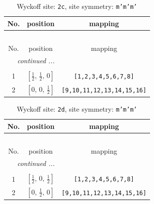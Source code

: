 \documentclass[fleqn,8pt]{jsarticle}
\begin{document}
\renewcommand{\arraystretch}{1.2}
\begin{longtable}{ccc}
\caption{Wyckoff site: {\tt 2c}, site symmetry: {\tt m'm'm'}}
 \\
 \hline \hline
No. & position & mapping \\ \hline \endfirsthead

\multicolumn{2}{l}{\tablename\ \thetable{}} \\
 \hline \hline
No. & position & mapping \\ \hline \endhead

 \hline \hline
\multicolumn{2}{r}{\footnotesize\it continued ...} \\ \endfoot

 \hline \hline
\multicolumn{2}{r}{} \\ \endlastfoot

1 & $\left[ \frac{1}{2},\, \frac{1}{2},\, 0 \right]$ & {\tt [1,2,3,4,5,6,7,8]} \\ \hline
2 & $\left[ 0,\, 0,\, \frac{1}{2} \right]$ & {\tt [9,10,11,12,13,14,15,16]} \\
\end{longtable}
\renewcommand{\arraystretch}{1.2}
\begin{longtable}{ccc}
\caption{Wyckoff site: {\tt 2d}, site symmetry: {\tt m'm'm'}}
 \\
 \hline \hline
No. & position & mapping \\ \hline \endfirsthead

\multicolumn{2}{l}{\tablename\ \thetable{}} \\
 \hline \hline
No. & position & mapping \\ \hline \endhead

 \hline \hline
\multicolumn{2}{r}{\footnotesize\it continued ...} \\ \endfoot

 \hline \hline
\multicolumn{2}{r}{} \\ \endlastfoot

1 & $\left[ \frac{1}{2},\, 0,\, \frac{1}{2} \right]$ & {\tt [1,2,3,4,5,6,7,8]} \\ \hline
2 & $\left[ 0,\, \frac{1}{2},\, 0 \right]$ & {\tt [9,10,11,12,13,14,15,16]} \\
\end{longtable}
\renewcommand{\arraystretch}{1.2}
\end{document}
